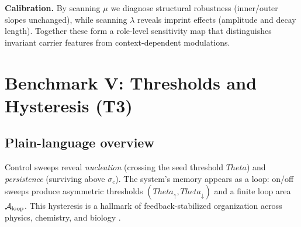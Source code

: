 \documentclass[12pt,a4paper,oneside]{scrreprt}
\def\Theta{Theta}%
\begin{document}
\noindent\textbf{Calibration.}  
By scanning $\mu$ we diagnose structural robustness (inner/outer slopes unchanged), 
while scanning $\lambda$ reveals imprint effects (amplitude and decay length). 
Together these form a role-level sensitivity map that distinguishes invariant carrier features from context-dependent modulations.


\chapter{Benchmark V: Thresholds and Hysteresis (T3)}
\section*{Plain-language overview}
Control sweeps reveal \emph{nucleation} (crossing the seed threshold $\Theta$) and \emph{persistence} (surviving above $\sigma_c$).  
The system’s memory appears as a loop: on/off sweeps produce asymmetric thresholds $(\Theta_\uparrow,\Theta_\downarrow)$ and a finite loop area $\mathcal A_{\rm loop}$.  
This hysteresis is a hallmark of feedback-stabilized organization across physics, chemistry, and biology \cite{Strogatz2015,Kardar2007,Ball2004}.
\end{document}
